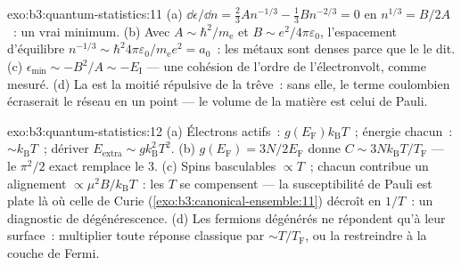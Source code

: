\begin{solution}{exo:b3:quantum-statistics:11}
(a) $\dd\epsilon/\dd n = \tfrac23 An^{-1/3} - \tfrac13 Bn^{-2/3} =
0$ en $n^{1/3} = B/2A$~: un vrai minimum. (b) Avec $A \sim
\hbar^2/m_{\text{e}}$ et $B \sim e^2/4\pi\varepsilon_0$,
l'espacement d'équilibre $n^{-1/3} \sim \hbar^2 4\pi\varepsilon_0/
m_{\text{e}}e^2 = a_0$~: les métaux sont denses parce que le 
le dit. (c) $\epsilon_{\min} \sim -B^2/A \sim -E_{\text{I}}$
--- une cohésion de l'ordre de l'électronvolt, comme mesuré. (d) La 
est la moitié répulsive de la trêve~: sans elle, le terme coulombien
écraserait le réseau en un point --- le volume de la matière est
celui de Pauli.
\end{solution}

\begin{solution}{exo:b3:quantum-statistics:12}
(a) Électrons actifs~: $g(E_{\text{F}})k_{\text{B}}T$~; énergie
chacun~: $\sim k_{\text{B}}T$~; dériver $E_{\text{extra}} \sim
g k_{\text{B}}^2T^2$. (b) $g(E_{\text{F}}) = 3N/2E_{\text{F}}$ donne
$C \sim 3Nk_{\text{B}}T/T_{\text{F}}$ --- le $\pi^2/2$ exact
remplace le 3. (c) Spins basculables $\propto T$~; chacun contribue
un alignement $\propto \mu^2B/k_{\text{B}}T$~: les $T$ se compensent
--- la susceptibilité de Pauli est plate là où celle de Curie
(\cref{exo:b3:canonical-ensemble:11}) décroît en $1/T$~: un
diagnostic de dégénérescence. (d) Les fermions dégénérés ne
répondent qu'à leur surface~: multiplier toute réponse classique par $\sim
T/T_{\text{F}}$, ou la restreindre à la couche de Fermi.
\end{solution}


